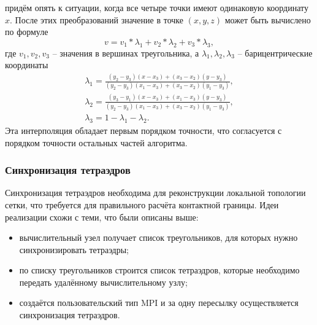 придём опять к ситуации, когда все четыре точки имеют одинаковую координату $x$.
После этих преобразований значение в точке $(x,y,z)$ может быть вычислено по формуле
\begin{equation}
\label{eq:triangle_interpolation}
v=v_1*\lambda_1+v_2*\lambda_2+v_3*\lambda_3, 
\end{equation}
где $v_1,v_2,v_3$ -- значения в вершинах треугольника, а $\lambda_1,\lambda_2,\lambda_3$ -- барицентрические координаты
\begin{eqnarray}
\label{eq:barycentric_coords}
\lambda_1=\frac{(y_2-y_3)(x-x_3)+(x_3-x_2)(y-y_3)}{(y_2-y_3)(x_1-x_3)+(x_3-x_2)(y_1-y_3)}, \nonumber \\
\lambda_2=\frac{(y_3-y_1)(x-x_3)+(x_1-x_3)(y-y_3)}{(y_2-y_3)(x_1-x_3)+(x_3-x_2)(y_1-y_3)}, \nonumber \\
\lambda_3=1-\lambda_1-\lambda_2.
\end{eqnarray}
Эта интерполяция обладает первым порядком точности, что согласуется с порядком точности остальных частей алгоритма.
\subsubsection{Синхронизация тетраэдров}
Синхронизация тетраэдров необходима для реконструкции локальной топологии сетки, что требуется для правильного расчёта контактной границы. Идеи реализации схожи с теми, что были описаны выше:
\begin{itemize}
	\item вычислительный узел получает список треугольников, для которых нужно синхронизировать тетраэдры;
	\item по списку треугольников строится список тетраэдров, которые необходимо передать удалённому вычислительному узлу;
	\item создаётся пользовательский тип MPI и за одну пересылку осуществляется синхронизация тетраэдров.
\end{itemize}
